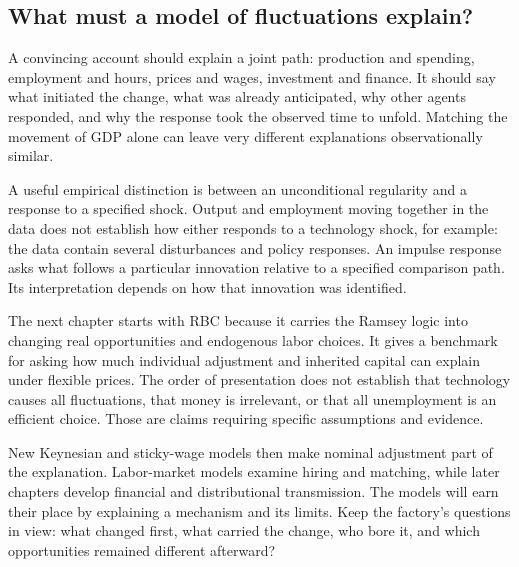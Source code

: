 \subsection{What must a model of fluctuations explain?}

A convincing account should explain a joint path: production and spending,
employment and hours, prices and wages, investment and finance. It should
say what initiated the change, what was already anticipated, why other
agents responded, and why the response took the observed time to unfold.
Matching the movement of GDP alone can leave very different explanations
observationally similar.

A useful empirical distinction is between an unconditional regularity and
a response to a specified shock. Output and employment moving together
in the data does not establish how either responds to a technology shock,
for example: the data contain several disturbances and policy responses.
An impulse response asks what follows a particular innovation relative
to a specified comparison path. Its interpretation depends on how that
innovation was identified.

The next chapter starts with RBC because it carries the Ramsey logic
into changing real opportunities and endogenous labor choices. It gives a
benchmark for asking how much individual adjustment and inherited capital
can explain under flexible prices. The order of presentation does not
establish that technology causes all fluctuations, that money is irrelevant,
or that all unemployment is an efficient choice. Those are claims requiring
specific assumptions and evidence.

New Keynesian and sticky-wage models then make nominal adjustment part of
the explanation. Labor-market models examine hiring and matching, while
later chapters develop financial and distributional transmission. The models
will earn their place by explaining a mechanism and its limits. Keep the
factory's questions in view: what changed first, what carried the change,
who bore it, and which opportunities remained different afterward?
